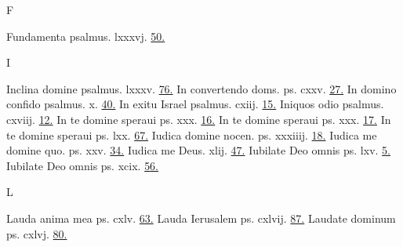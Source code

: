 \documentclass[a5paper,10pt]{book}
\begin{document}
\begin{multicols}{2}
\newline \vspace{-1.75em}
\begin{center}
\color{red} F
\end{center}
\vspace{-.75em}
\par \noindent Fundamenta psalmus. lxxxvj. \hfill \hyperlink{ps86}{50.}
\newline \vspace{-1.75em}
\begin{center}
\color{red} I
\end{center}
\vspace{-.75em}
\par \noindent Inclina domine psalmus. lxxxv. \hfill \hyperlink{ps85}{76.}
\newline In convertendo doms. ps. cxxv. \hfill \hyperlink{ps125}{27.}
\newline In domino confido psalmus. x. \hfill \hyperlink{ps10}{40.}
\newline In exitu Israel psalmus. cxiij. \hfill \hyperlink{ps113}{15.}
\newline Iniquos odio psalmus. cxviij. \hfill \hyperlink{ps118.8}{12.}
\newline In te domine speraui ps. xxx. \hfill \hyperlink{ps30.1}{16.}
\newline In te domine speraui ps. xxx. \hfill \hyperlink{ps30}{17.}
\newline In te domine speraui ps. lxx. \hfill \hyperlink{ps70}{67.}
\newline Iudica domine nocen. ps. xxxiiij. \hfill \hyperlink{ps34}{18.}
\newline Iudica me domine quo. ps. xxv. \hfill \hyperlink{ps25}{34.}
\newline Iudica me Deus. xlij. \hfill \hyperlink{ps42}{47.}
\newline Iubilate Deo omnis ps. lxv. \hfill \hyperlink{ps65}{5.}
\newline Iubilate Deo omnis ps. xcix. \hfill \hyperlink{ps99}{56.}
\newline \vspace{-1.75em}
\begin{center}
\color{red} L
\end{center}
\vspace{-.75em}
\par \noindent Lauda anima mea ps. cxlv. \hfill \hyperlink{ps145}{63.}
\newline Lauda Ierusalem ps. cxlvij. \hfill \hyperlink{ps147}{87.}
\newline Laudate dominum ps. cxlvj. \hfill \hyperlink{ps116}{80.}

\end{multicols}
\end{document}
